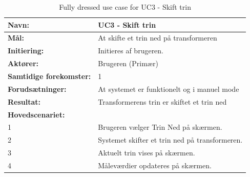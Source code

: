 \begin{table}[H]
	\centering
	
	\begin{threeparttable}
		\begin{tabularx}{\linewidth}{ l X }
			\toprule
			\bfseries{Navn:}				& UC3 - Skift trin  \\
			\midrule
			\bfseries{Mål:} 				& At skifte et trin ned på transformeren \\
			\midrule
			\bfseries{Initiering:} 			& Initieres af brugeren. \\
			\midrule
			\bfseries{Aktører:} 			& Brugeren (Primær) \\
			\midrule
			\bfseries{Samtidige forekomster:} & 1 \\
			\midrule
			\bfseries{Forudsætninger:} 		& At systemet er funktionelt og i manuel mode\\
			\midrule
			\bfseries{Resultat:} 			& Transformerens trin er skiftet et trin ned \\
			\midrule
			\bfseries{Hovedscenariet:} 	& \\
			
			
			1 	& Brugeren vælger Trin Ned på skærmen.\\
			2 	& Systemet skifter et trin ned på transformeren.\\
			3 	& Aktuelt trin vises på skærmen.\\
			4 	& Måleværdier opdateres på skærmen.\\			
			
			\bottomrule
			
		\end{tabularx}
	\end{threeparttable}
	\caption{Fully dressed use case for UC3 - Skift trin}
	\label{table:UC3}
\end{table}


